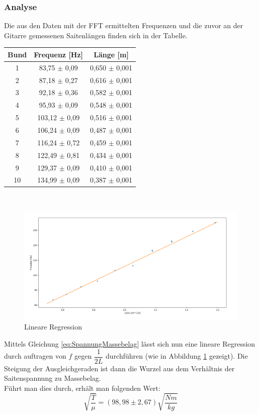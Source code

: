 \documentclass[12pt,a4paper]{article}
\begin{document}
\subsubsection{Analyse}
Die aus den Daten mit der FFT ermittelten Frequenzen und die zuvor an der Gitarre gemessenen Saitenlängen finden sich in der Tabelle. \\
\begin{tabular}{|c|c|c|}
\hline 
Bund & Frequenz [Hz] & Länge [m] \\ 
\hline 
1 & 83,75 $\pm$ 0,09 & 0,650 $\pm$ 0,001 \\ 
\hline 
2 & 87,18 $\pm$ 0,27 & 0,616 $\pm$ 0,001 \\ 
\hline 
3 & 92,18 $\pm$ 0,36 & 0,582 $\pm$ 0,001 \\ 
\hline 
4 & 95,93 $\pm$ 0,09 & 0,548 $\pm$ 0,001 \\ 
\hline 
5 & 103,12 $\pm$ 0,09 & 0,516 $\pm$ 0,001 \\ 
\hline 
6 & 106,24 $\pm$ 0,09 & 0,487 $\pm$ 0,001 \\ 
\hline 
7 & 116,24 $\pm$ 0,72 & 0,459 $\pm$ 0,001 \\ 
\hline 
8 & 122,49 $\pm$ 0,81 & 0,434 $\pm$ 0,001 \\ 
\hline 
9 & 129,37 $\pm$ 0,09 & 0,410 $\pm$ 0,001 \\ 
\hline 
10 & 134,99 $\pm$ 0,09 & 0,387 $\pm$ 0,001 \\ 
\hline 
\end{tabular} 
\\
\begin{figure}
\includegraphics[scale=0.45]{Bilder/SpannungMassebelagLineareRegression.png}
\centering
\caption{Lineare Regression}
\label{LineareRegressionSpannungMassebelag}
\end{figure}
Mittels Gleichung \ref{eq:SpannungMassebelag} lässt sich nun eine lineare Regression durch auftragen von $f$ gegen $\dfrac{1}{2L}$ durchführen (wie in Abbildung \ref{LineareRegressionSpannungMassebelag} gezeigt). Die Steigung der Ausgleichgeraden ist dann die Wurzel aus dem Verhältnis der Saitenspannung zu Massebelag. \\
Führt man dies durch, erhält man folgenden Wert:
\begin{equation}
\sqrt{\dfrac{T}{\mu}} = (98,98 \pm 2,67)\sqrt{\dfrac{Nm}{kg}}
\end{equation}
\end{document}
